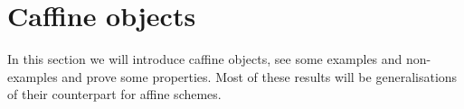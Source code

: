 \section{Caffine objects}
In this section we will introduce caffine objects, see some examples and non-examples
and prove some properties. 
Most of these results will be generalisations of their counterpart for affine schemes.








